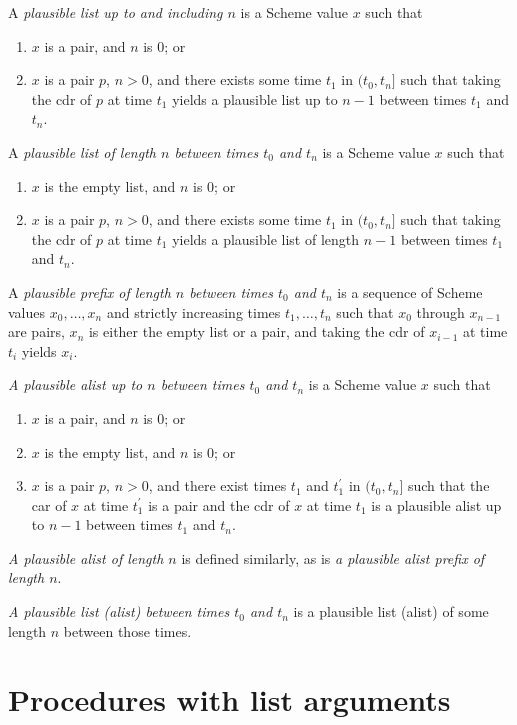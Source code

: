 A \textit{plausible list up to and including $n$} is a
Scheme value $x$ such that
%
\begin{enumerate}
\item $x$ is a pair, and $n$ is $0$; or
\item $x$ is a pair $p$, $n > 0$, and there exists some time
  $t_1$ in $(t_0,t_n]$ such that taking the cdr of $p$ at
  time $t_1$ yields a plausible list up to $n-1$ between
  times $t_1$ and $t_n$.
\end{enumerate}

A \textit{plausible list of length $n$ between times $t_0$ and $t_n$}
is a Scheme value $x$ such that

\begin{enumerate}
\item $x$ is the empty list, and $n$ is $0$; or
\item $x$ is a pair $p$, $n > 0$, and there exists some time
  $t_1$ in $(t_0,t_n]$ such that taking the cdr of $p$ at
  time $t_1$ yields a plausible list of length $n-1$
  between times $t_1$ and $t_n$.
\end{enumerate}

A \textit{plausible prefix of length $n$ between times $t_0$ and
  $t_n$} is a sequence of Scheme values $x_0,\ldots,x_n$ and strictly
increasing times $t_1,\ldots,t_n$ such that $x_0$ through $x_{n-1}$
are pairs, $x_n$ is either the empty list or a pair, and taking the
cdr of $x_{i-1}$ at time $t_i$ yields $x_i$.

\textit{A plausible alist up to $n$ between times $t_0$ and $t_n$} is
a Scheme value $x$ such that
\begin{enumerate}
\item $x$ is a pair, and $n$ is $0$; or
\item $x$ is the empty list, and $n$ is $0$; or
\item $x$ is a pair $p$, $n > 0$, and there exist times
  $t_1$ and $t_1^\prime$ in $(t_0,t_n]$ such that
  the car of $x$ at time $t_1^\prime$ is a pair and
  the cdr of $x$ at time $t_1$ is a plausible alist up to $n-1$
  between times $t_1$ and $t_n$.
\end{enumerate}

\textit{A plausible alist of length $n$} is defined similarly, as is
\textit{a plausible alist prefix of length $n$}.

\textit{A plausible list (alist) between times $t_0$ and $t_n$} is a
plausible list (alist) of some length $n$ between those times.

\section{Procedures with list arguments}
\label{proceduresmutablelistargumentssection}

